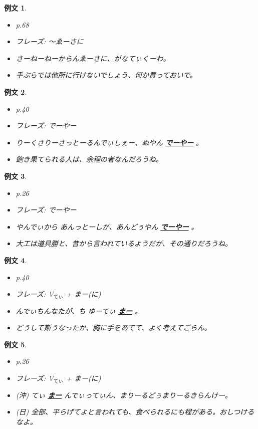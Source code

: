 \documentclass[a4j,12pt]{jarticle}
\theoremstyle{break}
\newtheorem{example}{例文}
\newcommand{\highlight}[1]{
  \textbf{\underline{#1}}
}
\begin{document}
\begin{example}
  \begin{itemize}
  \item p.68
  \item フレーズ: 〜ゑーさに
  \item {}さーねーねーからんゑーさに、がなてぃくーわ。
  \item 手ぶらでは他所に行けないでしょう、何か買っておいで。  
  \end{itemize}
\end{example}
\begin{example}
  \begin{itemize}
  \item p.40
  \item フレーズ: でーやー
  \item {}りーくさりーさっとーるんでぃしぇー、ぬやん\highlight{でーやー}。
  \item 飽き果てられる人は、余程の者なんだろうね。
  \end{itemize}
\end{example}
\begin{example}
  \begin{itemize}
  \item p.26
  \item フレーズ: でーやー
  \item {}やんでぃから あんっとーしが、あんどぅやん\highlight{でーやー}。
  \item 大工は道具勝と、昔から言われているようだが、その通りだろうね。
  \end{itemize}
\end{example}
\begin{example}
  \begin{itemize}
  \item p.40
  \item フレーズ: V$_{てぃ}$ + まー(に)
  \item {}んでぃちんなたが、ち ゆーてぃ\highlight{まー}。
  \item どうして斯うなったか、胸に手をあてて、よく考えてごらん。
  \end{itemize}
\end{example}
\begin{example}
  \begin{itemize}
  \item p.26
  \item フレーズ:  V$_{てぃ}$ + まー(に)
  \item (沖) てぃ\highlight{まー}んでぃってぃん、まりーるどぅまりーるきらんけー。
  \item (日) 全部、平らげてよと言われても、食べられるにも程がある。おしつけるなよ。
  \end{itemize}
\end{example}
\end{document}

